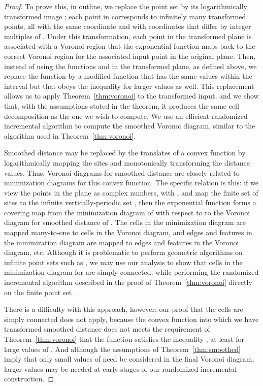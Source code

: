 \documentclass[10pt, conference, compsocconf]{IEEEtran}
\begin{document}
\begin{proof}
To prove this, in outline, we replace the point set  by its logarithmically transformed image ; each point in  corresponds to infinitely many transformed points, all with the same  coordinate and with  coordinates that differ by integer multiples of . Under this transformation, each point in the transformed plane is associated with a Voronoi region that the exponential function maps back to the correct Voronoi region for the associated input point in the original plane. Then, instead of using the functions  and  in the transformed plane, as defined above, we replace the function  by a modified function that has the same values within the interval  but that obeys the inequality  for larger values as well. This replacement allows us to apply Theorem~\ref{thm:voronoi} to the transformed input, and
we show that, with the assumptions stated in the theorem, it produces the same cell decomposition as the one we wish to compute. We use an efficient randomized incremental algorithm to compute the smoothed Voronoi diagram, similar to the algorithm used in Theorem~\ref{thm:voronoi}. 

Smoothed distance may be replaced by the translates of a convex function by logarithmically mapping the sites and monotonically transforming the distance values.
Thus, Voronoi diagrams for smoothed distance are closely related to minimization diagrams for this convex function. The specific relation is this: if we view the points in the plane as complex numbers,
with , and map the finite set  of sites to the infinite vertically-periodic set , then the exponential function forms a covering map from the minimization diagram of  with respect to  to the Voronoi diagram for smoothed distance of . The cells in the minimization diagram are mapped many-to-one to cells in the Voronoi diagram, and edges and features in the minimization diagram are mapped to edges and features in the Voronoi diagram, etc. Although it is problematic to perform geometric algorithms on infinite point sets such as , we may use our analysis to show that cells in the minimization diagram for  are simply connected, while performing the randomized incremental algorithm described in the proof of Theorem~\ref{thm:voronoi} directly on the finite point set .

There is a difficulty with this approach, however: our proof that the cells are simply connected does not apply, because the convex function into which we have transformed smoothed distance does not meets the requirement of Theorem~\ref{thm:voronoi} that the function  satisfies the inequality , at least for large values of . And although the assumptions of Theorem~\ref{thm:smoothed} imply that only small values of  need be considered in the final Voronoi diagram, larger values may be needed at early stages of our randomized incremental construction.


\end{proof}
\end{document}
